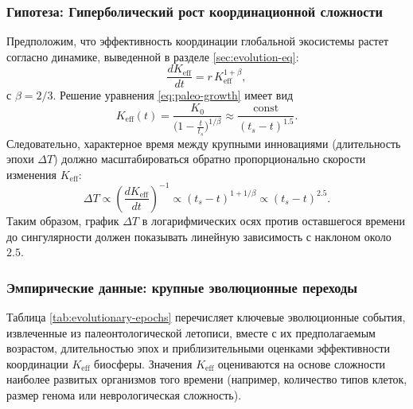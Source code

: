 \documentclass[12pt,a4paper]{article}
\theoremstyle{remark}
\begin{document}
	\subsubsection{Гипотеза: Гиперболический рост координационной сложности}
	
	Предположим, что эффективность координации глобальной экосистемы растет согласно динамике, выведенной в разделе \ref{sec:evolution-eq}:
	\begin{equation}
		\frac{dK_{\mathrm{eff}}}{dt} = r \, K_{\mathrm{eff}}^{1+\beta},
		\label{eq:paleo-growth}
	\end{equation}
	с $\beta = 2/3$. Решение уравнения \eqref{eq:paleo-growth} имеет вид
	\begin{equation}
		K_{\mathrm{eff}}(t) = \frac{K_0}{\bigl(1 - \frac{t}{t_s}\bigr)^{1/\beta}} \approx \frac{\text{const}}{(t_s - t)^{1.5}}.
		\label{eq:paleo-keff}
	\end{equation}
	Следовательно, характерное время между крупными инновациями (длительность эпохи $\Delta T$) должно масштабироваться обратно пропорционально скорости изменения $K_{\mathrm{eff}}$:
	\begin{equation}
		\Delta T \propto \left( \frac{dK_{\mathrm{eff}}}{dt} \right)^{-1} \propto (t_s - t)^{1 + 1/\beta} \propto (t_s - t)^{2.5}.
		\label{eq:paleo-dT}
	\end{equation}
	Таким образом, график $\Delta T$ в логарифмических осях против оставшегося времени до сингулярности должен показывать линейную зависимость с наклоном около $2.5$.
	
	\subsubsection{Эмпирические данные: крупные эволюционные переходы}
	
	Таблица \ref{tab:evolutionary-epochs} перечисляет ключевые эволюционные события, извлеченные из палеонтологической летописи, вместе с их предполагаемым возрастом, длительностью эпох и приблизительными оценками эффективности координации $K_{\mathrm{eff}}$ биосферы. Значения $K_{\mathrm{eff}}$ оцениваются на основе сложности наиболее развитых организмов того времени (например, количество типов клеток, размер генома или неврологическая сложность).
	
\end{document}
